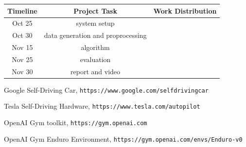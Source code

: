 \documentclass[a4paper]{article}
\begin{document}
\begin{center}
    \begin{tabular}{ | c | c | c | } 
        \hline
        Timeline & Project Task & Work Distribution   \\ 
        \hline
        Oct 25   & system setup &   \\ 
        \hline
        Oct 30   & data generation and proprocessing &   \\ 
        \hline
        Nov 15   & algorithm  &   \\ 
        \hline
        Nov 25   & evaluation  &   \\ 
        \hline
        Nov 30   & report and video  &   \\ 
        \hline
    \end{tabular}
\end{center}




\begin{thebibliography}{9}
  Google Self-Driving Car, \texttt{https://www.google.com/selfdrivingcar}

  Tesla Self-Driving Hardware, \texttt{https://www.tesla.com/autopilot}

  OpenAI Gym toolkit, \texttt{https://gym.openai.com}

  OpenAI Gym Enduro Environment, \texttt{https://gym.openai.com/envs/Enduro-v0}

\end{thebibliography}
\end{document}
